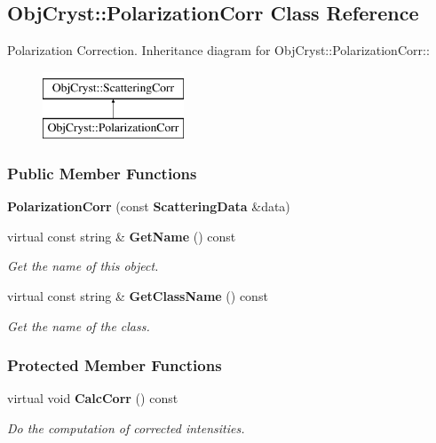\subsection{ObjCryst::PolarizationCorr Class Reference}
\label{a00060}


Polarization Correction.  
Inheritance diagram for ObjCryst::PolarizationCorr::\begin{figure}[H]
\begin{center}
\leavevmode
\includegraphics[height=2cm]{a00060}
\end{center}
\end{figure}
\subsubsection*{Public Member Functions}
\begin{DoxyCompactItemize}
\item 
{\bfseries PolarizationCorr} (const {\bf ScatteringData} \&data)\label{a00060_a2a4847d1595188d8023f20c9c9d0d4ce}

\item 
virtual const string \& {\bf GetName} () const \label{a00060_a6bfca1f83186379f77e2ee2ef5e65ac5}

\begin{DoxyCompactList}\small\item\em Get the name of this object. \item\end{DoxyCompactList}\item 
virtual const string \& {\bf GetClassName} () const \label{a00060_ae298bdf956280d610cc18aad4acb1af7}

\begin{DoxyCompactList}\small\item\em Get the name of the class. \item\end{DoxyCompactList}\end{DoxyCompactItemize}
\subsubsection*{Protected Member Functions}
\begin{DoxyCompactItemize}
\item 
virtual void {\bf CalcCorr} () const \label{a00060_a3030bd67935be0434c1cebfd385b82a2}

\begin{DoxyCompactList}\small\item\em Do the computation of corrected intensities. \item\end{DoxyCompactList}\end{DoxyCompactItemize}
